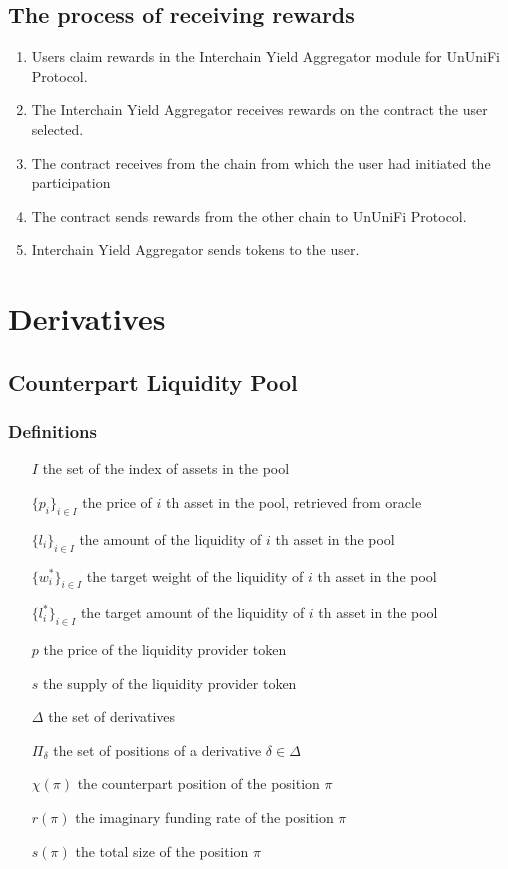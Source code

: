 \documentclass[dvipdfmx]{jsarticle}
\begin{document}
\subsection{The process of receiving rewards}
\begin{enumerate}
  \item Users claim rewards in the Interchain Yield Aggregator module for UnUniFi Protocol.
  \item The Interchain Yield Aggregator receives rewards on the contract the user selected.
  \item The contract receives from the chain from which the user had initiated the participation
  \item The contract sends rewards from the other chain to UnUniFi Protocol.
  \item Interchain Yield Aggregator sends tokens to the user.
\end{enumerate}

\section{Derivatives}

\subsection{Counterpart Liquidity Pool}

\subsubsection{Definitions}

\begin{itemize}
  \item[$I$] the set of the index of assets in the pool
  \item[$\{p_i\}_{i \in I}$] the price of $i$ th asset in the pool, retrieved from oracle
  \item[$\{l_i\}_{i \in I}$] the amount of the liquidity of $i$ th asset in the pool
  \item[$\{w_i^*\}_{i \in I}$] the target weight of the liquidity of $i$ th asset in the pool
  \item[$\{l_i^*\}_{i \in I}$] the target amount of the liquidity of $i$ th asset in the pool
  \item[$p$] the price of the liquidity provider token
  \item[$s$] the supply of the liquidity provider token
  \item[$\Delta$] the set of derivatives 
  \item[$\Pi_\delta$] the set of positions of a derivative $\delta \in \Delta$
  \item[$\chi(\pi)$] the counterpart position of the position $\pi$
  \item[$r(\pi)$] the imaginary funding rate of the position $\pi$
  \item[$s(\pi)$] the total size of the position $\pi$
\end{itemize}
\end{document}
